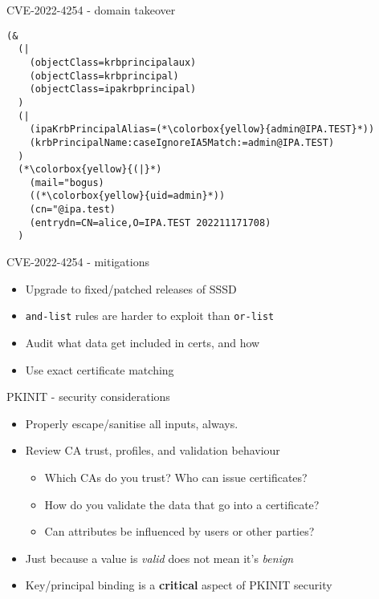 \documentclass[ignorenonframetext,aspectratio=169,12pt]{beamer}
\begin{document}
\begin{frame}[fragile]{CVE-2022-4254 - domain takeover}
\protect\hypertarget{vuln-filter-mail}{}
\begin{lstlisting}[basicstyle=\ttfamily\footnotesize]
(&
  (|
    (objectClass=krbprincipalaux)
    (objectClass=krbprincipal)
    (objectClass=ipakrbprincipal)
  )
  (|
    (ipaKrbPrincipalAlias=(*\colorbox{yellow}{admin@IPA.TEST}*))
    (krbPrincipalName:caseIgnoreIA5Match:=admin@IPA.TEST)
  )
  (*\colorbox{yellow}{(|}*)
    (mail="bogus)
    ((*\colorbox{yellow}{uid=admin}*))
    (cn="@ipa.test)
    (entrydn=CN=alice,O=IPA.TEST 202211171708)
  )
\end{lstlisting}
\end{frame}

\begin{frame}{CVE-2022-4254 - mitigations}
\protect\hypertarget{vuln-mitigations}{}

\begin{itemize}
\item Upgrade to fixed/patched releases of SSSD
\item {\tt and-list} rules are harder to exploit than {\tt or-list}
\item Audit what data get included in certs, and how
\item Use exact certificate matching
\end{itemize}
\end{frame}

\begin{frame}{PKINIT - security considerations}
\protect\hypertarget{pkinit-security-considerations}{}

\begin{itemize}
\item Properly escape/sanitise all inputs, always.
\item Review CA trust, profiles, and validation behaviour
    \begin{itemize}
    \item Which CAs do you trust?  Who can issue certificates?
    \item How do you validate the data that go into a certificate?
    \item Can attributes be influenced by users or other parties?
    \end{itemize}
\item Just because a value is {\em valid} does not mean it's {\em benign}
\item Key/principal binding is a {\bf critical} aspect of PKINIT security
\end{itemize}
\end{frame}
\end{document}
